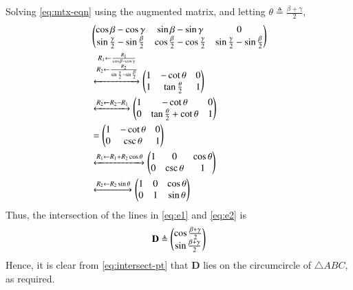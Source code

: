 \documentclass[journal,12pt,twocolumn]{IEEEtran}
\renewcommand{\vec}[1]{\boldsymbol{\mathbf{#1}}}
\begin{document}
\begin{enumerate}
    Solving \eqref{eq:mtx-eqn} using the augmented matrix, and letting 
    $\theta \triangleq \frac{\beta+\gamma}{2}$,
    \begin{align}
        &\begin{pmatrix}\cos\beta-\cos\gamma&\sin\beta-\sin\gamma&0\\\sin\frac{\gamma}{2}-\sin\frac{\beta}{2}&\cos\frac{\beta}{2}-\cos\frac{\gamma}{2}&\sin\frac{\gamma}{2}-\sin\frac{\beta}{2}\end{pmatrix} \\
        &\xleftrightarrow[]{\substack{R_1\leftarrow\frac{R_1}{\cos\beta-\cos\gamma}\\R_2\leftarrow\frac{R_2}{\sin\frac{\gamma}{2}-\sin\frac{\beta}{2}}}}\begin{pmatrix}1&-\cot\theta&0\\1&\tan\frac{\theta}{2}&1\end{pmatrix} \\
        &\xleftrightarrow[]{R_2\leftarrow R_2-R_1}\begin{pmatrix}1&-\cot\theta&0\\0&\tan\frac{\theta}{2}+\cot\theta&1\end{pmatrix} \\
        &= \begin{pmatrix}1&-\cot\theta&0\\0&\csc\theta&1\end{pmatrix} \\
        &\xleftrightarrow[]{R_1\leftarrow R_1 + R_2\cos\theta}\begin{pmatrix}1&0&\cos\theta\\0&\csc\theta&1\end{pmatrix} \\
        &\xleftrightarrow[]{R_2\leftarrow R_2\sin\theta}\begin{pmatrix}1&0&\cos\theta\\0&1&\sin\theta\end{pmatrix}
        \label{eq:aug-mtx}
    \end{align}
    Thus, the intersection of the lines in \eqref{eq:e1} and \eqref{eq:e2} is
    \begin{align}
        \vec{D} \triangleq \myvec{\cos\frac{\beta+\gamma}{2}\\\sin\frac{\beta+\gamma}{2}}
        \label{eq:intersect-pt}
    \end{align}
    Hence, it is clear from \eqref{eq:intersect-pt} that $\vec{D}$ lies on the 
    circumcircle of $\triangle ABC$, as required.


\end{enumerate}
\end{document}
